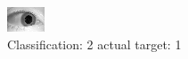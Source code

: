 \begin{figure}[h!]
\begin{center}
\includegraphics[width=0.60\columnwidth]{figures/ID1436_class_2_target_1.png}
\end{center}
\caption{ Classification: 2 actual target: 1}
\label{fig:ID1436_class_2_target_1}
\end{figure}
